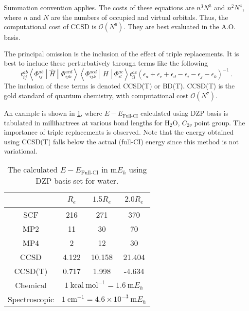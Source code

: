 \documentclass{article}
\theoremstyle{plain}\theoremheaderfont{\normalfont\itshape}\theorembodyfont{\rmfamily}\theoremseparator{.}\newtheorem*{rem}{Remark}\newtheorem*{ex}{Example}\newtheorem*{proof}{Proof}\newtheorem*{altp}{Alternative proof}
\theoremstyle{plain}\theoremheaderfont{\normalfont\bfseries}\theorembodyfont{\rmfamily}\theoremseparator{.}\newtheorem{thm}{Theorem}[section]\newtheorem{lem}[thm]{Lemma}\newtheorem{prop}[thm]{Proposition}\newtheorem*{cor}{Corollary}\newtheorem{defn}[thm]{Definition}\newtheorem{clm}[thm]{Claim}\newtheorem{clminproof}{Claim}
\theoremstyle{break}\theoremheaderfont{\normalfont\itshape}\theorembodyfont{\rmfamily}\theoremseparator{.\medskip}\newtheorem*{proofskip}{Proof}\newtheorem*{exs}{Examples}\newtheorem*{rems}{Remarks}
\theoremstyle{break}\theoremheaderfont{\normalfont\bfseries}\theorembodyfont{\rmfamily}\theoremseparator{.\medskip}\newtheorem{lemskip}[thm]{Lemma}\newtheorem{defnskip}[thm]{Definition}\newtheorem{propskip}[thm]{Proposition}\newtheorem{thmskip}[thm]{Theorem}
\numberwithin{equation}{section}
\newcommand{\unit}[1]{\ \mathrm{#1}}
\newcommand{\mel}[3]{\left\langle #1 \middle| #2 \middle| #3 \right\rangle}
\begin{document}
    Summation convention applies. The costs of these equations are \(n^3N^3\) and \(n^2N^4\), where \(n\) and \(N\) are the numbers of occupied and virtual orbitals. Thus, the computational cost of CCSD is \(\mathcal{O}(N^6)\). They are best evaluated in the A.O. basis.

    The principal omission is the inclusion of the effect of triple replacements. It is best to include these perturbatively through terms like the following
    \begin{equation}
        t_{ij}^{ab}\mel{\Phi_{ij}^{ab}}{\hat{H}}{\Phi_{ijk}^{acd}}\mel{\Phi_{ijk}^{acd}}{\hat{H}}{\Phi_{il}^{ac}}t_{il}^{ac}(\epsilon_a+\epsilon_c+\epsilon_d-\epsilon_i-\epsilon_j-\epsilon_k)^{-1}\,.
    \end{equation}
    The inclusion of these terms is denoted CCSD(T) or BD(T). CCSD(T) is the gold standard of quantum chemistry, with computational cost \(\mathcal{O}(N^7)\).

    An example is shown in \cref{Tab:Method_Energy}, where \(E-E_{\text{Full-CI}}\) calculated using DZP basis is tabulated in millihartrees at various bond lengths for H\(_2\)O, \(C_{2v}\) point group. The importance of triple replacements is observed. Note that the energy obtained using CCSD(T) falls below the actual (full-CI) energy since this method is not variational.

    \begin{table}
        \centering
        \begin{tabular}{cccc}
            \toprule
            ~ & \(R_e\) & \(1.5 R_e\) & \(2.0R_e\) \\ \midrule
            SCF & 216 & 271 & 370 \\
            MP2 & 11 & 30 & 70 \\
            MP4 & 2 & 12 & 30 \\
            CCSD & 4.122 & 10.158 & 21.404 \\
            CCSD(T) & 0.717 & 1.998 & -4.634 \\ \midrule
            Chemical & \multicolumn{3}{c}{\(1\unit{kcal}\unit{mol}^{-1}=1.6\unit{m}E_h\)} \\
            Spectroscopic &  \multicolumn{3}{c}{\(1\unit{cm}^{-1}=4.6\times 10^{-3}\unit{m}E_h\)} \\ \bottomrule
        \end{tabular}
        \caption{The calculated \(E-E_{\text{Full-CI}}\) in \(\mathrm{m}E_h\) using DZP basis set for water.}
        \label{Tab:Method_Energy}
    \end{table}
\end{document}
